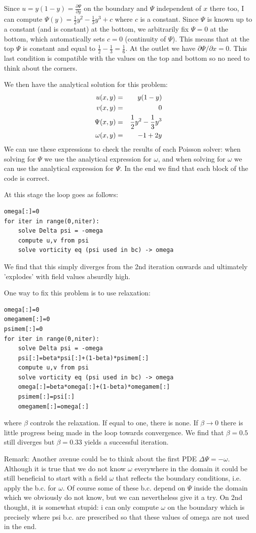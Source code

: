 Since $u=y(1-y) = \frac{\partial \Psi}{\partial y}$ on the boundary and $\Psi$ independent of $x$ there too, I can compute 
$\Psi(y)=\frac12 y^2 - \frac13 y^3 + c$ where $c$ is a constant.
Since $\Psi$ is known up to a constant (and is constant) at the bottom, we arbitrarily fix $\Psi=0$ at the bottom, which automatically sets $c=0$ (continuity of $\Psi$). 
This means that at the top $\Psi$ is constant and equal to $\frac12-\frac13=\frac16$. At the outlet we have $\partial \Psi/\partial x=0$. This last condition is 
compatible with the values on the top and bottom so no need to think about the corners.

We then have the analytical solution for this problem:
\begin{eqnarray}
u(x,y)&=& y(1-y) \nonumber\\
v(x,y)&=& 0 \nonumber\\
\Psi(x,y)&=& \frac12 y^2 - \frac13 y^3  \nonumber\\
\omega(x,y) &=& - 1+2y
\end{eqnarray}
We can use these expressions to check the results of each Poisson solver: 
when solving for $\Psi$ we use the analytical expression for $\omega$, and when 
solving for $\omega$ we can use the analytical expression for $\Psi$. 
In the end we find that each block of the code is correct. 

At this stage the loop goes as follows:
\begin{verbatim}
omega[:]=0
for iter in range(0,niter):
    solve Delta psi = -omega
    compute u,v from psi 
    solve vorticity eq (psi used in bc) -> omega
\end{verbatim}
We find that this simply diverges from the 2nd iteration onwards and ultimately 'explodes' with field values absurdly high.

One way to fix this problem is to use relaxation:
\begin{verbatim}
omega[:]=0
omegamem[:]=0
psimem[:]=0
for iter in range(0,niter):
    solve Delta psi = -omega
    psi[:]=beta*psi[:]+(1-beta)*psimem[:]
    compute u,v from psi 
    solve vorticity eq (psi used in bc) -> omega
    omega[:]=beta*omega[:]+(1-beta)*omegamem[:]
    psimem[:]=psi[:]
    omegamem[:]=omega[:]
\end{verbatim}
where $\beta$ controls the relaxation. If equal to one, there is none. If $\beta\rightarrow 0$ there is little progress being made in the loop towards convergence.
We find that $\beta=0.5$ still diverges but $\beta=0.33$ yields a successful iteration.

Remark: Another avenue could be to think about the first PDE $\Delta \Psi = -\omega$.
Although it is true that we do not know $\omega$ everywhere in the domain it 
could be still beneficial to start with a field $\omega$ that reflects the boundary conditions, i.e. apply the b.c. for $\omega$. Of course some of these b.c. depend on $\Psi$ inside the domain which we obviously do not know, but we can nevertheless give it a try. On 2nd thought, it is somewhat stupid: i can only compute $\omega$ on the boundary which is precisely where psi b.c. are prescribed so that these values 
of omega are not used in the end.


